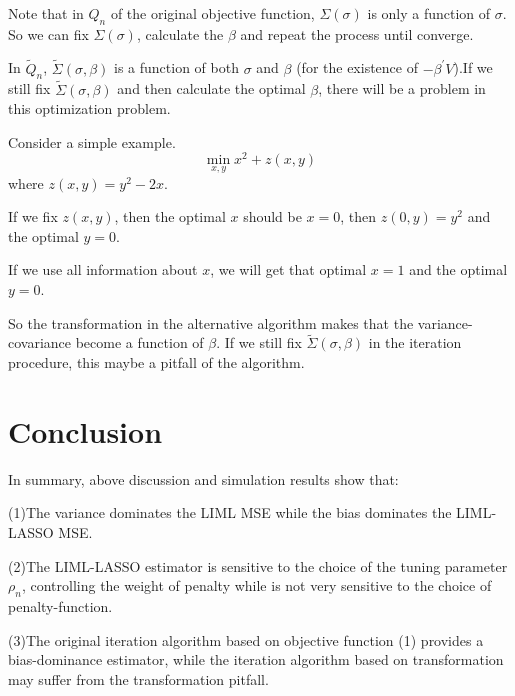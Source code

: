 \documentclass[12pt,pdftex,letterpaper]{article}
\begin{document}
    Note that in $Q_{n}$ of the original objective function, $\Sigma(\sigma)$ is only a function of $\sigma$. So we can fix $\Sigma(\sigma)$, calculate the $\beta$ and repeat the process until converge. 
    
    In $\tilde{Q}_{n}$, $\tilde{\Sigma}(\sigma,\beta)$ is a function of both $\sigma$ and $\beta$ (for the existence of $-\beta^{'}V$).If we still fix  $\tilde{\Sigma}(\sigma,\beta)$ and then calculate the optimal $\beta$, there will be a problem in this optimization problem.
    
    Consider a simple example.
    $$\min_{x,y} x^{2}+z(x,y)$$    
    where $z(x,y)=y^{2}-2x.$
    
    If we fix $z(x,y)$, then the optimal $x$ should be $x=0$, then $z(0,y)=y^{2}$ and the optimal $y=0$.
    
    If we use all information about $x$, we will get that optimal $x=1$ and the optimal $y=0$.
    
    So the transformation in the alternative algorithm makes that the variance-covariance become a function of $\beta$. If we still fix $\tilde{\Sigma}(\sigma,\beta)$ in the iteration procedure, this maybe a pitfall of the algorithm.
    
\section{Conclusion}
    In summary, above discussion and simulation results show that:
    
    (1)The variance dominates the LIML MSE while the bias dominates the LIML-LASSO MSE.
    
    (2)The LIML-LASSO estimator is sensitive to the choice of the tuning parameter $\rho_{n}$, controlling the weight of penalty while is not very sensitive to the choice of penalty-function.
    
    (3)The original iteration algorithm based on objective function (1) provides a bias-dominance estimator, while the iteration algorithm based on transformation may suffer from the transformation pitfall.
%
%
\end{document}
